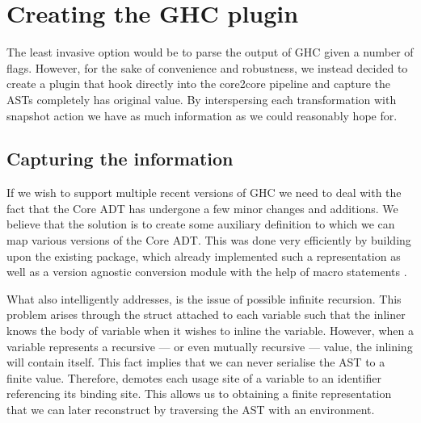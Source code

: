 %     
% 
%     
%   
%   
% 
% 
\section{Creating the GHC plugin}

The least invasive option would be to parse the output of GHC given a number of  flags. However, for the sake
of convenience and robustness, we instead decided to create a plugin that hook directly into the core2core pipeline and
capture the ASTs completely has original value. By interspersing each transformation with snapshot action we have as much information
as we could reasonably hope for.

\subsection{Capturing the information}
\label{section:methods:capturing_info}

If we wish to support multiple recent versions of GHC we need to deal with the fact that the Core ADT has undergone
a few minor changes and additions. We believe that the solution is to create some auxiliary definition to which we can
map various versions of the Core ADT. This was done very efficiently by building upon the existing  package,
which already implemented such a representation as well as a version agnostic conversion module with the help of 
macro statements \cite{ghc_dump}. 

What  also intelligently addresses, is the issue of possible infinite recursion.
This problem arises through the  struct attached to each variable such that the inliner
knows the body of variable when it wishes to inline the variable. However, when a variable represents a recursive ---
or even mutually recursive --- value, the inlining will contain itself. This fact implies that we can never serialise 
the AST to a finite value. Therefore,  demotes each usage site of a variable to an identifier referencing its binding site.
This allows us to obtaining a finite representation that we can later reconstruct by traversing
the AST with an environment.

